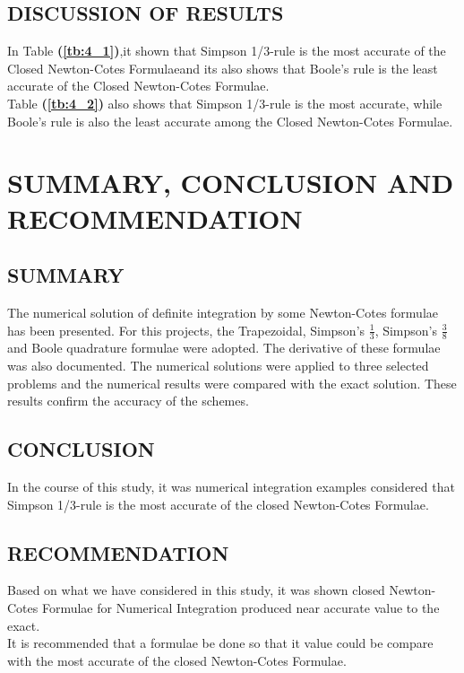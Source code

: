 \documentclass[12pt]{report}
\newcommand{\refn}[1]{\textbf{(\ref{#1})}}
\newcommand{\NCF}{Newton-Cotes Formulae}
\newcommand{\dsp}{\displaystyle}
\newcommand{\NI}{\noindent}
\begin{document}
	\section{DISCUSSION OF RESULTS}
	In Table \refn{tb:4_1},it shown that Simpson 1/3-rule is the most accurate of the Closed \NCF and its also shows that Boole's rule is the least accurate of the Closed \NCF.\\
	
	\NI Table \refn{tb:4_2} also shows that Simpson 1/3-rule is the most accurate, while Boole's rule is also the least accurate among the Closed \NCF.
	
	
	
	\chapter{SUMMARY, CONCLUSION AND RECOMMENDATION}
	\section{SUMMARY}
	
	
	
	The numerical solution of definite integration by some Newton-Cotes formulae has been presented. For this projects, the Trapezoidal, Simpson's $\dsp \frac{1}{3}$, Simpson's $\dsp \frac{3}{8}$ and Boole quadrature formulae were adopted. The derivative of these formulae was also documented. The numerical solutions were applied to three selected problems and the numerical results were compared with the exact solution. These results confirm the accuracy of the schemes.
	
	
	
	\section{CONCLUSION}
	In the course of this study, it was numerical integration examples considered that Simpson 1/3-rule is the most accurate of the closed Newton-Cotes Formulae.
	
	\section{RECOMMENDATION}
	Based on what we have considered in this study, it was shown closed Newton-Cotes Formulae for Numerical Integration produced near accurate value to the exact.\\
	
	\NI It is recommended that a formulae be done so that it value could be compare with the most accurate of the closed Newton-Cotes Formulae.
	
\end{document}
